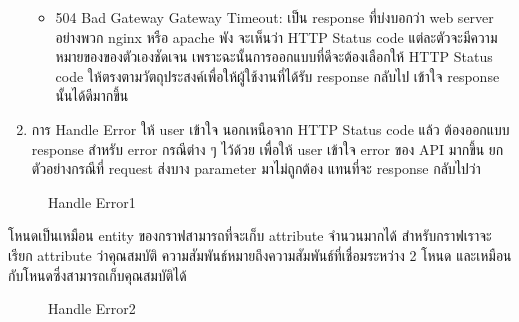 \documentclass[14pt,oneside,openright,a4paper]{cpe-thai-project}
\begin{document}
\begin{enumerate}
\begin{itemize}
            \item 504 Bad Gateway Gateway Timeout: เป็น response ที่บ่งบอกว่า web server อย่างพวก nginx หรือ apache พัง
                  จะเห็นว่า HTTP Status code แต่ละตัวจะมีความหมายของของตัวเองชัดเจน เพราะฉะนั้นการออกแบบที่ดีจะต้องเลือกให้ HTTP Status code ให้ตรงตามวัตถุประสงค์เพื่อให้ผู้ใช้งานที่ได้รับ response กลับไป เข้าใจ response นั้นได้ดีมากขึ้น \\
          \end{itemize}
        \item การ Handle Error ให้ user เข้าใจ
              นอกเหนือจาก HTTP Status code แล้ว ต้องออกแบบ response สำหรับ error กรณีต่าง ๆ ไว้ด้วย เพื่อให้ user เข้าใจ error ของ API มากขึ้น ยกตัวอย่างกรณีที่ request ส่งบาง parameter มาไม่ถูกต้อง แทนที่จะ response กลับไปว่า
      \end{enumerate}

  \begin{figure}[!h]\centering
    \setlength{\fboxrule}{0.5mm} %
    \setlength{\fboxsep}{0.5cm}
    \caption{Handle Error1}\label{fig:Error1}
  \end{figure}

โหนดเป็นเหมือน entity ของกราฟสามารถที่จะเก็บ attribute จำนวนมากได้ สำหรับกราฟเราจะเรียก attribute ว่าคุณสมบัติ
ความสัมพันธ์หมายถึงความสัมพันธ์ที่เชื่อมระหว่าง 2 โหนด และเหมือนกับโหนดซึ่งสามารถเก็บคุณสมบัติได้ \\

\newpage

  \begin{figure}[!h]\centering
    \setlength{\fboxrule}{0.5mm} %
    \setlength{\fboxsep}{0.5cm}
    \caption{Handle Error2}\label{fig:Error2}
  \end{figure}
\end{document}
